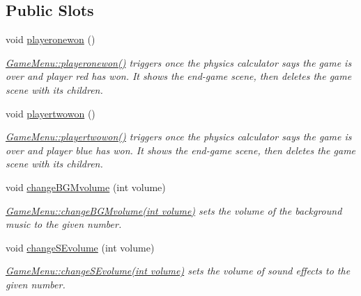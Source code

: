 \subsection*{Public Slots}
\begin{DoxyCompactItemize}
\item 
void \hyperlink{class_game_menu_a3e3677db66b2c65a9f0de92f41fe3698}{playeronewon} ()\hypertarget{class_game_menu_a3e3677db66b2c65a9f0de92f41fe3698}{}\label{class_game_menu_a3e3677db66b2c65a9f0de92f41fe3698}

\begin{DoxyCompactList}\small\item\em \hyperlink{class_game_menu_a3e3677db66b2c65a9f0de92f41fe3698}{Game\+Menu\+::playeronewon()} triggers once the physics calculator says the game is over and player red has won. It shows the end-\/game scene, then deletes the game scene with it\textquotesingle{}s children. \end{DoxyCompactList}\item 
void \hyperlink{class_game_menu_a7cf2904dfdb06e5bd6423d80fda61739}{playertwowon} ()\hypertarget{class_game_menu_a7cf2904dfdb06e5bd6423d80fda61739}{}\label{class_game_menu_a7cf2904dfdb06e5bd6423d80fda61739}

\begin{DoxyCompactList}\small\item\em \hyperlink{class_game_menu_a7cf2904dfdb06e5bd6423d80fda61739}{Game\+Menu\+::playertwowon()} triggers once the physics calculator says the game is over and player blue has won. It shows the end-\/game scene, then deletes the game scene with it\textquotesingle{}s children. \end{DoxyCompactList}\item 
void \hyperlink{class_game_menu_a41521364226c92bfdedc97b4445c8763}{change\+B\+G\+Mvolume} (int volume)
\begin{DoxyCompactList}\small\item\em \hyperlink{class_game_menu_a41521364226c92bfdedc97b4445c8763}{Game\+Menu\+::change\+B\+G\+Mvolume(int volume)} sets the volume of the background music to the given number. \end{DoxyCompactList}\item 
void \hyperlink{class_game_menu_abb166085ca8e741d1901cdedda86f0d3}{change\+S\+Evolume} (int volume)
\begin{DoxyCompactList}\small\item\em \hyperlink{class_game_menu_abb166085ca8e741d1901cdedda86f0d3}{Game\+Menu\+::change\+S\+Evolume(int volume)} sets the volume of sound effects to the given number. \end{DoxyCompactList}\end{DoxyCompactItemize}
